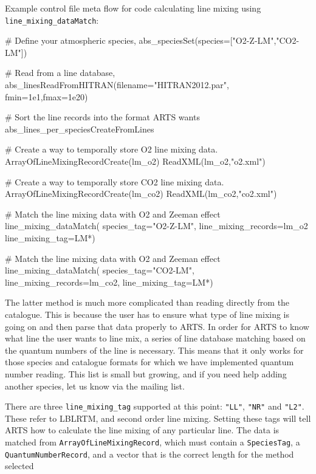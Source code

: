 Example control file meta flow for code calculating line mixing using \verb|line_mixing_dataMatch|:
\begin{code}
# Define your atmospheric species,
abs_speciesSet(species=["O2-Z-LM","CO2-LM"])

# Read from a line database,
abs_linesReadFromHITRAN(filename="HITRAN2012.par", 
    fmin=1e1,fmax=1e20)

# Sort the line records into the format ARTS wants
abs_lines_per_speciesCreateFromLines

# Create a way to temporally store O2 line mixing data.
ArrayOfLineMixingRecordCreate(lm_o2)
ReadXML(lm_o2,"o2.xml")

# Create a way to temporally store CO2 line mixing data.
ArrayOfLineMixingRecordCreate(lm_co2)
ReadXML(lm_co2,"co2.xml")

# Match the line mixing data with O2 and Zeeman effect
line_mixing_dataMatch(
    species_tag="O2-Z-LM",
    line_mixing_records=lm_o2
    line_mixing_tag=LM*)

# Match the line mixing data with O2 and Zeeman effect
line_mixing_dataMatch(
    species_tag="CO2-LM",
    line_mixing_records=lm_co2,
    line_mixing_tag=LM*)
\end{code}
The latter method is much more complicated than reading directly from the catalogue.
This is because the user has to ensure what type of line mixing is going on
and then parse that data properly to ARTS.  In order for ARTS to know what line the user 
wants to line mix, a series of line database matching 
based on the quantum numbers of the line is necessary.
This means that it only works for those species and catalogue formats
for which we have implemented quantum number reading.
This list is small but growing, and if you need help adding another species, 
let us know via the mailing list.

There are three \verb|line_mixing_tag| supported at this point:
\verb|"LL"|, \verb|"NR"| and \verb|"L2"|.  These refer to LBLRTM, and second order line mixing.
Setting these tags will tell ARTS how to calculate the line mixing of any particular line.
The data is matched from \verb|ArrayOfLineMixingRecord|,
which must contain a \verb|SpeciesTag|, a
\verb|QuantumNumberRecord|, and a vector that is the correct length for the method selected

